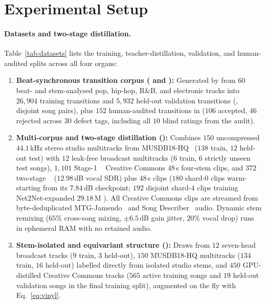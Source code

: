 \section{Experimental Setup}
\label{sec:experiments}

\paragraph{Datasets and two-stage distillation.}
Table~\ref{tab:datasets} lists the training, teacher-distillation, validation, and human-audited splits across all four organs:
\begin{enumerate}
  \item \textbf{Beat-synchronous transition corpus ( and ):} Generated by  from $60$ beat- and stem-analysed pop, hip-hop, R\&B, and electronic tracks into $26{,}904$ training transitions and $5{,}932$ held-out validation transitions (, disjoint song pairs), plus $152$ human-audited transitions in  ($106$ accepted, $46$ rejected across $30$ defect tags, including all $10$ blind ratings from the  audit).
  \item \textbf{Multi-corpus and two-stage  distillation ():} Combines $150$ uncompressed $44.1$\,kHz stereo studio multitracks from MUSDB18-HQ~\citep{MUSDB18HQ} ($138$ train, $12$ held-out test) with $12$ leak-free broadcast multitracks ($6$ train, $6$ strictly unseen test songs), $1{,}101$ Stage-1 ~\citep{rouard2023hybrid} Creative Commons $48$\,s four-stem clips, and $372$ two-stage ~\citep{lu2024bsroformer} ($12.98$\,dB vocal SDR) plus  $48$\,s clips ($180$ shard-0 clips warm-starting  from its $7.84$\,dB checkpoint; $192$ disjoint shard-4 clips training Net2Net-expanded $29.18$\,M ). All Creative Commons clips are streamed from byte-deduplicated MTG-Jamendo~\citep{bogdanov2019mtg} and Song Describer~\citep{manco2023song} audio. Dynamic stem remixing ($65\%$ cross-song mixing, $\pm 6.5$\,dB gain jitter, $20\%$ vocal drop) runs in ephemeral RAM with no retained audio.
  \item \textbf{Stem-isolated and equivariant structure ():} Draws from $12$ seven-head broadcast tracks ($9$ train, $3$ held-out), $150$ MUSDB18-HQ multitracks ($134$ train, $16$ held-out) labelled directly from isolated studio stems, and $450$ GPU-distilled Creative Commons tracks ($565$ active training songs and $19$ held-out validation songs in the final training split), augmented on the fly with Eq.~\eqref{eq:vinyl}.
\end{enumerate}

